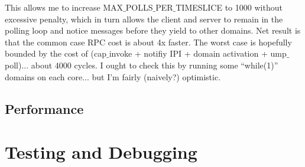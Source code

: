 \documentclass[a4paper,11pt,twoside]{report}
\begin{document}
This allows me to increase MAX$\_$POLLS$\_$PER$\_$TIMESLICE to 1000
without excessive penalty, which in turn allows the client and server
to remain in the polling loop and notice messages before they yield to
other domains.  Net result is that the common case RPC cost is about
4x faster.  The worst case is hopefully bounded by the cost of
(cap$\_$invoke + notifiy IPI + domain activation + ump$\_$poll)... about
4000 cycles.  I ought to check this by running some ``while(1)''
domains on each core... but I'm fairly (naively?) optimistic.


\section{Performance}

\chapter{Testing and Debugging}
\end{document}
